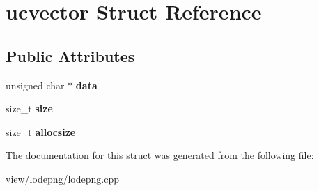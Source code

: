 \hypertarget{structucvector}{\section{ucvector Struct Reference}
\label{structucvector}
}
\subsection*{Public Attributes}
\begin{DoxyCompactItemize}
\item 
\hypertarget{structucvector_ace794c5713208c5a20f21762cd87c919}{unsigned char $\ast$ {\bfseries data}}\label{structucvector_ace794c5713208c5a20f21762cd87c919}

\item 
\hypertarget{structucvector_a27c99c34de0c5b3ca0c242d402c69499}{size\-\_\-t {\bfseries size}}\label{structucvector_a27c99c34de0c5b3ca0c242d402c69499}

\item 
\hypertarget{structucvector_a235168baac13f0c78bd3e309dc170f90}{size\-\_\-t {\bfseries allocsize}}\label{structucvector_a235168baac13f0c78bd3e309dc170f90}

\end{DoxyCompactItemize}


The documentation for this struct was generated from the following file\-:\begin{DoxyCompactItemize}
\item 
view/lodepng/lodepng.\-cpp\end{DoxyCompactItemize}
